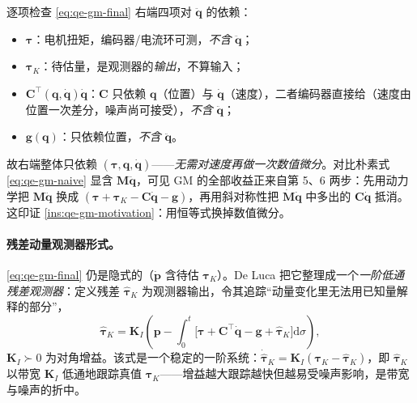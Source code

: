 \begin{derivation}\label{deriv:qe-gm}
逐项检查 \cref{eq:qe-gm-final} 右端四项对 $\ddot{\boldsymbol q}$ 的依赖：
\begin{itemize}
  \item $\boldsymbol\tau$：电机扭矩，编码器/电流环可测，\emph{不含} $\ddot{\boldsymbol q}$；
  \item $\boldsymbol\tau_K$：待估量，是观测器的\emph{输出}，不算输入；
  \item $\mathbf{C}^\top(\boldsymbol q,\dot{\boldsymbol q})\dot{\boldsymbol q}$：$\mathbf{C}$ 只依赖 $\boldsymbol q$（位置）与 $\dot{\boldsymbol q}$（速度），二者编码器直接给（速度由位置一次差分，噪声尚可接受），\emph{不含} $\ddot{\boldsymbol q}$；
  \item $\boldsymbol g(\boldsymbol q)$：只依赖位置，\emph{不含} $\ddot{\boldsymbol q}$。
\end{itemize}
故右端整体只依赖 $(\boldsymbol\tau,\boldsymbol q,\dot{\boldsymbol q})$——\emph{无需对速度再做一次数值微分}。对比朴素式 \cref{eq:qe-gm-naive} 显含 $\mathbf{M}\ddot{\boldsymbol q}$，可见 GM 的全部收益正来自第 5、6 两步：先用动力学把 $\mathbf{M}\ddot{\boldsymbol q}$ 换成 $(\boldsymbol\tau+\boldsymbol\tau_K-\mathbf{C}\dot{\boldsymbol q}-\boldsymbol g)$，再用斜对称性把 $\dot{\mathbf{M}}\dot{\boldsymbol q}$ 中多出的 $\mathbf{C}\dot{\boldsymbol q}$ 抵消。这印证 \cref{ins:qe-gm-motivation}：用恒等式换掉数值微分。
\end{derivation}

\paragraph{残差动量观测器形式。}
\cref{eq:qe-gm-final} 仍是隐式的（$\dot{\boldsymbol p}$ 含待估 $\boldsymbol\tau_K$）。De Luca 把它整理成一个\emph{一阶低通残差观测器}\cite{deluca2006collision}：定义残差 $\hat{\boldsymbol\tau}_K$ 为观测器输出，令其追踪“动量变化里无法用已知量解释的部分”，
\begin{equation}
  \hat{\boldsymbol\tau}_K = \mathbf{K}_I\!\left(\boldsymbol p - \int_0^t\!\big[\boldsymbol\tau + \mathbf{C}^\top\dot{\boldsymbol q} - \boldsymbol g + \hat{\boldsymbol\tau}_K\big]\mathrm{d}\sigma\right),
  \label{eq:qe-gm-observer}
\end{equation}
$\mathbf{K}_I\succ0$ 为对角增益。该式是一个稳定的一阶系统：$\dot{\hat{\boldsymbol\tau}}_K=\mathbf{K}_I(\boldsymbol\tau_K-\hat{\boldsymbol\tau}_K)$，即 $\hat{\boldsymbol\tau}_K$ 以带宽 $\mathbf{K}_I$ 低通地跟踪真值 $\boldsymbol\tau_K$——增益越大跟踪越快但越易受噪声影响，是带宽与噪声的折中。

